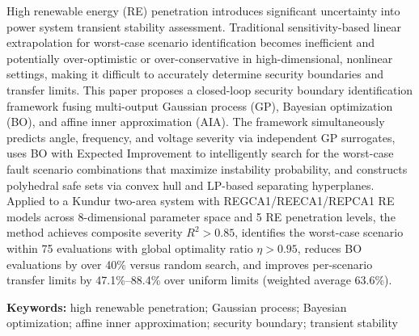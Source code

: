 \begin{enabstract}
High renewable energy (RE) penetration introduces significant uncertainty into power system transient stability assessment. Traditional sensitivity-based linear extrapolation for worst-case scenario identification becomes inefficient and potentially over-optimistic or over-conservative in high-dimensional, nonlinear settings, making it difficult to accurately determine security boundaries and transfer limits. This paper proposes a closed-loop security boundary identification framework fusing multi-output Gaussian process (GP), Bayesian optimization (BO), and affine inner approximation (AIA). The framework simultaneously predicts angle, frequency, and voltage severity via independent GP surrogates, uses BO with Expected Improvement to intelligently search for the worst-case fault scenario combinations that maximize instability probability, and constructs polyhedral safe sets via convex hull and LP-based separating hyperplanes. Applied to a Kundur two-area system with REGCA1/REECA1/REPCA1 RE models across 8-dimensional parameter space and 5 RE penetration levels, the method achieves composite severity $R^2 > 0.85$, identifies the worst-case scenario within 75 evaluations with global optimality ratio $\eta > 0.95$, reduces BO evaluations by over 40\% versus random search, and improves per-scenario transfer limits by 47.1\%--88.4\% over uniform limits (weighted average 63.6\%).

\medskip
\textbf{Keywords:} high renewable penetration; Gaussian process; Bayesian optimization; affine inner approximation; security boundary; transient stability
\end{enabstract}
